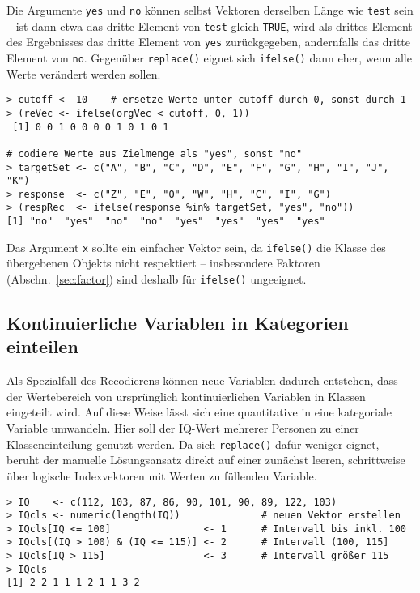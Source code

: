 Die Argumente \lstinline!yes! und \lstinline!no! können selbst Vektoren derselben Länge wie \lstinline!test! sein -- ist dann etwa das dritte Element von \lstinline!test! gleich \lstinline!TRUE!, wird als drittes Element des Ergebnisses das dritte Element von \lstinline!yes! zurückgegeben, andernfalls das dritte Element von \lstinline!no!. Gegenüber \lstinline!replace()! eignet sich \lstinline!ifelse()! dann eher, wenn alle Werte verändert werden sollen.
\begin{lstlisting}
> cutoff <- 10    # ersetze Werte unter cutoff durch 0, sonst durch 1
> (reVec <- ifelse(orgVec < cutoff, 0, 1))
 [1] 0 0 1 0 0 0 0 1 0 1 0 1

# codiere Werte aus Zielmenge als "yes", sonst "no"
> targetSet <- c("A", "B", "C", "D", "E", "F", "G", "H", "I", "J", "K")
> response  <- c("Z", "E", "O", "W", "H", "C", "I", "G")
> (respRec  <- ifelse(response %in% targetSet, "yes", "no"))
[1] "no"  "yes"  "no"  "no"  "yes"  "yes"  "yes"  "yes"
\end{lstlisting}

Das Argument \lstinline!x! sollte ein einfacher Vektor sein, da \lstinline!ifelse()! die Klasse des übergebenen Objekts nicht respektiert -- insbesondere Faktoren (Abschn.\ \ref{sec:factor}) sind deshalb für \lstinline!ifelse()! ungeeignet.

\subsection{Kontinuierliche Variablen in Kategorien einteilen}
\label{sec:discretize}

Als Spezialfall des Recodierens können neue Variablen dadurch entstehen, dass der Wertebereich von ursprünglich kontinuierlichen Variablen in Klassen eingeteilt wird. Auf diese Weise lässt sich eine quantitative in eine kategoriale Variable umwandeln. Hier soll der IQ-Wert mehrerer Personen zu einer Klasseneinteilung genutzt werden. Da sich \lstinline!replace()! dafür weniger eignet, beruht der manuelle Lösungsansatz direkt auf einer zunächst leeren, schrittweise über logische Indexvektoren mit Werten zu füllenden Variable.
\begin{lstlisting}
> IQ    <- c(112, 103, 87, 86, 90, 101, 90, 89, 122, 103)
> IQcls <- numeric(length(IQ))              # neuen Vektor erstellen
> IQcls[IQ <= 100]                <- 1      # Intervall bis inkl. 100
> IQcls[(IQ > 100) & (IQ <= 115)] <- 2      # Intervall (100, 115]
> IQcls[IQ > 115]                 <- 3      # Intervall größer 115
> IQcls
[1] 2 2 1 1 1 2 1 1 3 2
\end{lstlisting}

